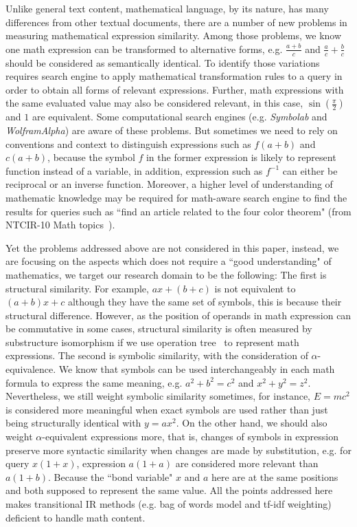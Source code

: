 \documentclass{acm_proc_article-sp}
\begin{document}
Unlike general text content, mathematical language, by its nature, has many differences from other textual documents, there are a number of new problems in measuring mathematical expression similarity.
Among those problems, we know one math expression can be transformed to alternative forms, e.g. $\frac{a + b}{c}$ and $\frac{a}{c} + \frac{b}{c}$ should be considered as semantically identical. To identify those variations requires search engine to apply mathematical transformation rules to a query in order to obtain all forms of relevant expressions. 
Further, math expressions with the same evaluated value may also be considered relevant, in this case, $\sin(\frac {\pi} 2)$ and $1$ are equivalent. Some computational search engines (e.g. \textit{Symbolab} and \textit{WolframAlpha}) are aware of these problems.
But sometimes we need to rely on conventions and context to distinguish expressions such as $f(a+b)$ and $c(a+b)$, because the symbol $f$ in the former expression is likely to represent function instead of a variable, 
in addition, expression such as $f^{-1}$ can either be reciprocal or an inverse function.
Moreover, a higher level of understanding of mathematic knowledge may be required for math-aware search engine to find the results for queries such as ``find an article related to the four color theorem" (from NTCIR-10 Math topics~\cite{ntcirtopic}).

Yet the problems addressed above are not considered in this paper, instead, we are focusing on the aspects which does not require a ``good understanding" of mathematics, we target our research domain to be the following:
The first is structural similarity. For example, $ax+(b+c)$ is not equivalent to $(a+b)x+c$ although they have the same set of symbols, this is because their structural difference. However, as the position of operands in math expression can be commutative in some cases, structural similarity is often measured by substructure isomorphism if we use operation tree~\cite{goodsurvey} to represent math expressions.
The second is symbolic similarity, with the consideration of $\alpha$-equivalence. We know that symbols can be used interchangeably in each math formula to express the same meaning, e.g. $a^2+b^2=c^2$ and $x^2+y^2=z^2$. Nevertheless, we still weight symbolic similarity sometimes, for instance, $E=mc^2$ is considered more meaningful when exact symbols are used rather than just being structurally identical with $y=ax^2$.
On the other hand, we should also weight $\alpha$-equivalent expressions more, that is, changes of symbols in expression preserve more syntactic similarity when changes are made by substitution, e.g. for query $x(1+x)$, expression $a(1+a)$ are considered more relevant than $a(1+b)$. Because the ``bond variable" $x$ and $a$ here are at the same positions and both supposed to represent the same value.
All the points addressed here makes transitional IR methods (e.g. bag of words model and tf-idf weighting) deficient to handle math content. 
\end{document}
